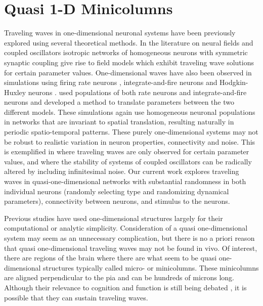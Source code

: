 
\chapter{Quasi 1-D Minicolumns}
Traveling waves in one-dimensional neuronal systems have been previously explored using several theoretical methods.
In the literature on neural fields \citep{Ermentrout1979}\citep{Folias2012} and coupled oscillators \citep{Kopell1986}\citep{Williams1997} isotropic networks of homogeneous neurons with symmetric synaptic coupling give rise to field models which exhibit traveling wave solutions for certain parameter values. 
One-dimensional waves have also been observed in simulations using firing rate neurons \citep{Roxin2005}, integrate-and-fire neurons \citep{Bressloff1997}\citep{Golomb1999} and Hodgkin-Huxley neurons \citep{Golomb1997}.
\citet{Senk2020} used populations of both rate neurons and integrate-and-fire neurons and developed a method to translate parameters between the two different models.
These simulations again use homogeneous neuronal populations in networks that are invariant to spatial translation, resulting naturally in periodic spatio-temporal patterns.
These purely one-dimensional systems may not be robust to realistic variation in neuron properties, connectivity and noise.
This is exemplified in \citet{Senk2020} where traveling waves are only observed for certain parameter values, and \citet{Strogatz1991} where the stability of systems of coupled oscillators can be radically altered by including infinitesimal noise.
Our current work explores traveling waves in quasi-one-dimensional networks with substantial randomness in both individual neurons (randomly selecting type and randomizing dynamical parameters), connectivity between neurons, and stimulus to the neurons.

Previous studies have used one-dimensional structures largely for their computational or analytic simplicity. 
Consideration of a quasi one-dimensional system may seem as an unnecessary complication, but there is no a priori reason that quasi one-dimensional traveling waves may not be found in vivo.
Of interest, there are regions of the brain where there are what seem to be quasi  one-dimensional structures \citep{buxhoeveden2002}\citep{mountcastle1997} typically called micro- or minicolumns. 
These minicolumns are aligned perpendicular to the pia and can be hundreds of microns long.  
Although their relevance to cognition and function is still being debated \citep{horton2005}\citep{Cruz2009}\citep{buxhoeveden2002}, it is possible that they can sustain traveling waves.

